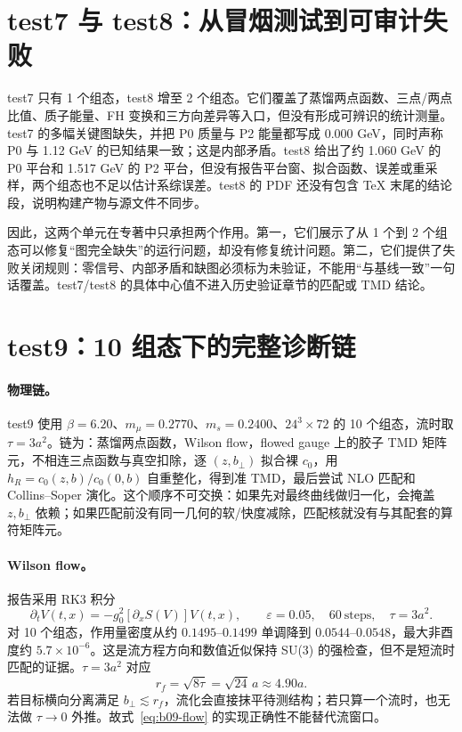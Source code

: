 \section{test7 与 test8：从冒烟测试到可审计失败}
\label{subsec:b09-smoke}

test7 只有 1 个组态，test8 增至 2 个组态。它们覆盖了蒸馏两点函数、三点/两点比值、质子能量、FH 变换和三方向差异等入口，但没有形成可辨识的统计测量。test7 的多幅关键图缺失，并把 P0 质量与 P2 能量都写成 0.000 GeV，同时声称 P0 与 1.12 GeV 的已知结果一致；这是内部矛盾。test8 给出了约 1.060 GeV 的 P0 平台和 1.517 GeV 的 P2 平台，但没有报告平台窗、拟合函数、误差或重采样，两个组态也不足以估计系综误差。test8 的 PDF 还没有包含 TeX 末尾的结论段，说明构建产物与源文件不同步。

因此，这两个单元在专著中只承担两个作用。第一，它们展示了从 1 个到 2 个组态可以修复“图完全缺失”的运行问题，却没有修复统计问题。第二，它们提供了失败关闭规则：零信号、内部矛盾和缺图必须标为未验证，不能用“与基线一致”一句话覆盖。test7/test8 的具体中心值不进入历史验证章节的匹配或 TMD 结论。

\section{test9：10 组态下的完整诊断链}
\label{subsec:b09-test9}

\paragraph{物理链。}
test9 使用 \(\beta=6.20\)、\(m_\mu=0.2770\)、\(m_s=0.2400\)、\(24^3\times72\) 的 10 个组态，流时取 \(\tau=3a^2\)。链为：蒸馏两点函数，Wilson flow，flowed gauge 上的胶子 TMD 矩阵元，不相连三点函数与真空扣除，逐 \((z,b_\perp)\) 拟合裸 \(c_0\)，用 \(h_R=c_0(z,b)/c_0(0,b)\) 自重整化，得到准 TMD，最后尝试 NLO 匹配和 Collins--Soper 演化。这个顺序不可交换：如果先对最终曲线做归一化，会掩盖 \(z,b_\perp\) 依赖；如果匹配前没有同一几何的软/快度减除，匹配核就没有与其配套的算符矩阵元。

\paragraph{Wilson flow。}
报告采用 RK3 积分
\begin{equation}
  \partial_t V(t,x)=-g_0^2\left[\partial_x S(V)\right]V(t,x),
  \qquad \varepsilon=0.05,\quad 60\ \text{steps},\quad \tau=3a^2.
  \label{eq:b09-flow}
\end{equation}
对 10 个组态，作用量密度从约 \(0.1495\)--\(0.1499\) 单调降到 \(0.0544\)--\(0.0548\)，最大非酉度约 \(5.7\times10^{-6}\)。这是流方程方向和数值近似保持 SU(3) 的强检查，但不是短流时匹配的证据。\(\tau=3a^2\) 对应
\begin{equation}
  r_f=\sqrt{8\tau}=\sqrt{24}\,a\approx4.90a.
  \label{eq:b09-flow-radius}
\end{equation}
若目标横向分离满足 \(b_\perp\lesssim r_f\)，流化会直接抹平待测结构；若只算一个流时，也无法做 \(\tau\to0\) 外推。故式~\eqref{eq:b09-flow} 的实现正确性不能替代流窗口。

